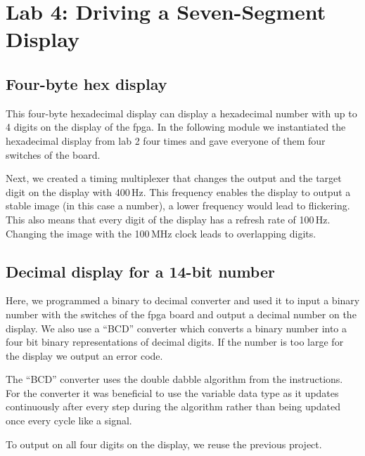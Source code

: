 \chapter{Lab 4: Driving a Seven-Segment Display} \label{day4}



\section{Four-byte hex display}

This four-byte hexadecimal display can display a hexadecimal number with up to 4 digits on the display of the \gls{fpga}. In the following module we instantiated the hexadecimal display from lab 2 four times and gave everyone of them four switches of the board. 

Next, we created a timing multiplexer that changes the output and the target digit on the display with 400\,Hz. This frequency enables the display to output a stable image (in this case a number), a lower frequency would lead to flickering. This also means that every digit of the display has a refresh rate of 100\,Hz. Changing the image with the 100\,MHz clock leads to overlapping digits.





\section{Decimal display for a 14-bit number}

Here, we programmed a binary to decimal converter and used it to input a binary number with the switches of the \gls{fpga} board and output a decimal number on the display. We also use a ``BCD'' converter which converts a binary number into a four bit binary representations of decimal digits. If the number is too large for the display we output an error code. 

The ``BCD'' converter uses the double dabble algorithm from the instructions. For the converter it was beneficial to use the variable data type as it updates continuously after every step during the algorithm rather than being updated once every cycle like a signal.

To output on all four digits on the display, we reuse the previous project. 



